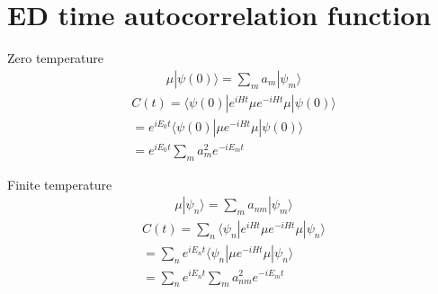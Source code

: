 \documentclass[a4paper,11pt]{ctexart}
\begin{document}
\section{ED time autocorrelation function}
Zero temperature
\begin{align}
    \mu | \psi(0) \rangle  =  \sum_m a_m | \psi_m \rangle
\end{align} 
\begin{align}
    C(t) =  \langle \psi(0) | e^{iHt} \mu e^{-iHt} \mu | \psi(0) \rangle \\
    =  e^{iE_0t} \langle \psi(0) | \mu e^{-iHt} \mu | \psi(0) \rangle \\
    =  e^{iE_0t} \sum_m a_m^2 e^{-iE_mt}
\end{align} 

Finite temperature
\begin{align}
    \mu | \psi_n \rangle  =  \sum_m a_{nm} | \psi_m \rangle
\end{align} 
\begin{align}
    C(t) = \sum_n \langle \psi_n | e^{iHt} \mu e^{-iHt} \mu | \psi_n \rangle \\
    =  \sum_n e^{iE_nt} \langle \psi_n | \mu e^{-iHt} \mu | \psi_n \rangle \\
    =  \sum_n e^{iE_nt} \sum_m a_{nm}^2 e^{-iE_mt}
\end{align} 
\end{document}
